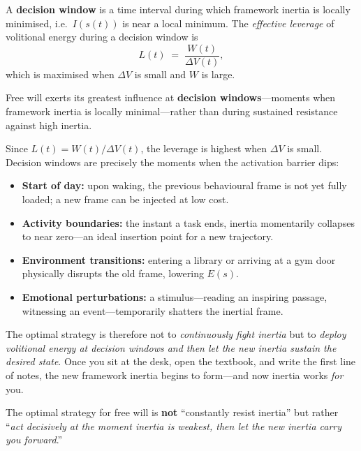 \begin{definition}\label{def:window}
A \textbf{decision window} is a time interval during which framework inertia
is locally minimised, i.e.\ $I(s(t))$ is near a local minimum. The
\emph{effective leverage} of volitional energy during a decision window is
\[
  L(t) \;=\; \frac{W(t)}{\Delta V(t)},
\]
which is maximised when $\Delta V$ is small and $W$ is large.
\end{definition}

\begin{theorem}\label{thm:leverage}
Free will exerts its greatest influence at \textbf{decision windows}---moments
when framework inertia is locally minimal---rather than during sustained
resistance against high inertia.
\end{theorem}

\begin{discussion}
Since $L(t) = W(t)/\Delta V(t)$, the leverage is highest when $\Delta V$ is
small. Decision windows are precisely the moments when the activation barrier
dips:
\begin{itemize}[nosep]
  \item \textbf{Start of day:} upon waking, the previous behavioural frame is
        not yet fully loaded; a new frame can be injected at low cost.
  \item \textbf{Activity boundaries:} the instant a task ends, inertia
        momentarily collapses to near zero---an ideal insertion point for a
        new trajectory.
  \item \textbf{Environment transitions:} entering a library or arriving at
        a gym door physically disrupts the old frame, lowering $E(s)$.
  \item \textbf{Emotional perturbations:} a stimulus---reading an inspiring
        passage, witnessing an event---temporarily shatters the inertial
        frame.
\end{itemize}
The optimal strategy is therefore not to \emph{continuously fight inertia} but
to \emph{deploy volitional energy at decision windows and then let the new
inertia sustain the desired state}. Once you sit at the desk, open the
textbook, and write the first line of notes, the new framework inertia begins
to form---and now inertia works \emph{for} you.
\end{discussion}

\begin{insightbox}
The optimal strategy for free will is \textbf{not} ``constantly resist
inertia'' but rather ``\emph{act decisively at the moment inertia is weakest,
then let the new inertia carry you forward}.''
\end{insightbox}

